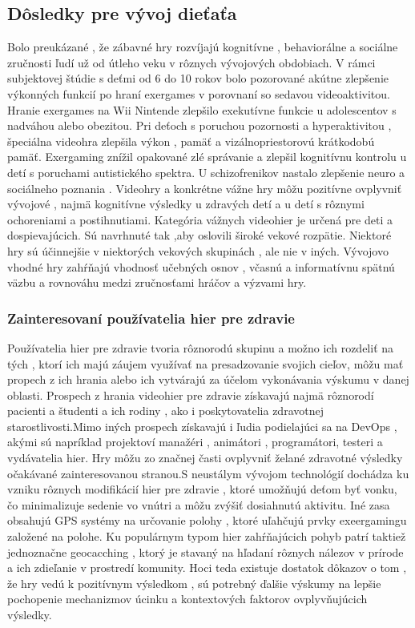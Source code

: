 \documentclass[10pt,oneside,slovak,a4paper]{article}
\begin{document}
\subsection{Dôsledky pre vývoj dieťaťa}
Bolo preukázané , že zábavné hry rozvíjajú kognitívne , behaviorálne a sociálne zručnosti ľudí už od útleho veku v rôznych vývojových obdobiach. \cite{7067095}V rámci subjektovej štúdie s deťmi od 6 do 10 rokov bolo pozorované akútne zlepšenie výkonných funkcií po hraní exergames v porovnaní so sedavou videoaktivitou. Hranie exergames na Wii Nintende zlepšilo exekutívne funkcie u adolescentov s nadváhou alebo obezitou. Pri deťoch s poruchou pozornosti a hyperaktivitou , špeciálna videohra zlepšila výkon , pamäť a vizálnopriestorovú krátkodobú pamäť. Exergaming znížil opakované zlé správanie a zlepšil kognitívnu kontrolu u detí s poruchami autistického spektra. U schizofrenikov nastalo zlepšenie neuro a sociálneho poznania . Videohry a konkrétne vážne hry môžu pozitívne ovplyvniť vývojové , najmä kognitívne výsledky u zdravých detí a u detí s rôznymi ochoreniami a postihnutiami. Kategória vážnych videohier je určená pre deti a dospievajúcich. Sú navrhnuté tak ,aby oslovili široké vekové rozpätie. Niektoré hry sú účinnejšie v niektorých vekových skupinách , ale nie v iných. Vývojovo vhodné hry zahŕňajú vhodnosť učebných osnov , včasnú a informatívnu spätnú väzbu a rovnováhu medzi zručnosťami hráčov a výzvami hry.
\subsubsection{Zainteresovaní používatelia hier pre zdravie}
Používatelia hier pre zdravie tvoria rôznorodú skupinu a možno ich rozdeliť na tých , ktorí ich majú záujem využívať na presadzovanie svojich cieľov, môžu mať propech z ich hrania alebo ich vytvárajú za účelom vykonávania výskumu v danej oblasti. Prospech z hrania videohier pre zdravie získavajú najmä rôznorodí pacienti a študenti a ich rodiny , ako i poskytovatelia zdravotnej starostlivosti.Mimo iných prospech získavajú i ľudia podielajúci sa na DevOps , akými sú napríklad projektoví manažéri , animátori , programátori, testeri a vydávatelia hier. Hry môžu zo značnej časti ovplyvniť želané zdravotné výsledky očakávané zainteresovanou stranou.S neustálym vývojom technológií dochádza ku vzniku rôznych modifikácií hier pre zdravie , ktoré umožňujú deťom byť vonku, čo minimalizuje sedenie vo vnútri a môžu zvýšiť dosiahnutú aktivitu. \cite{6662126} Iné zasa obsahujú GPS systémy na určovanie polohy , ktoré uľahčujú prvky exeergamingu založené na polohe. Ku populárnym typom hier zahŕňajúcich pohyb patrí taktiež jednoznačne geocacching , ktorý je stavaný na hľadaní rôznych nálezov v prírode a ich zdieľanie v prostredí komunity. Hoci teda existuje dostatok dôkazov o tom , že hry vedú k pozitívnym výsledkom , sú potrebný ďalšie výskumy na lepšie pochopenie mechanizmov úcinku a kontextových faktorov ovplyvňujúcich výsledky.
\end{document}
